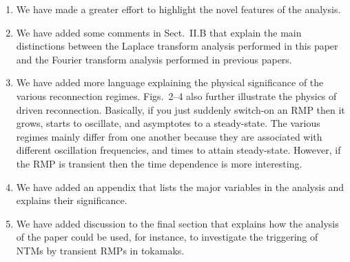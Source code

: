 \documentclass{article}[12pt]
\begin{document}
\begin{description}
\begin{enumerate}
\end{enumerate}

\item[Referee 3]
\begin{enumerate}
\item We have made a greater effort to highlight the novel features of the analysis. 

\item We have added some comments in Sect.~II.B that explain the main distinctions between the Laplace transform analysis performed in this
paper and the Fourier transform analysis performed in previous papers. 

\item We have added more language explaining the physical significance of the various reconnection regimes. Figs.~2--4 also further illustrate
the physics of driven reconnection. Basically, if you just suddenly switch-on an RMP then it grows, starts to oscillate, and asymptotes to
a steady-state. The various regimes mainly differ from one another because they are associated with different oscillation frequencies, and
times to attain steady-state. However, if the RMP is transient then the time dependence is more interesting. 

\item We have added an appendix that lists the major variables in the analysis and explains their significance. 

\item We have added discussion to the final section that explains how the analysis of the paper could be used, for instance, to
investigate the triggering of NTMs by transient RMPs in tokamaks. 
\end{enumerate}
\end{description}
\end{document}
